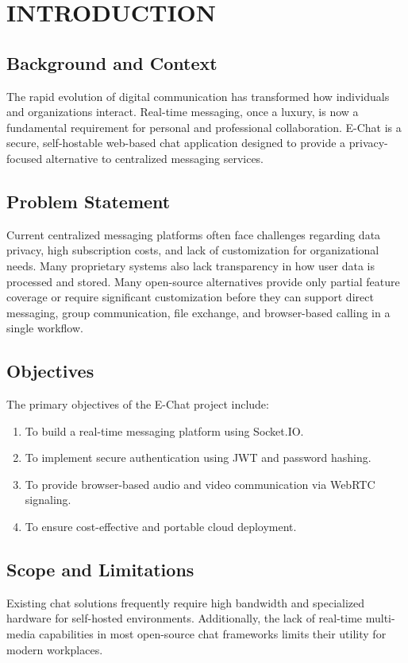 \documentclass[12pt,a4paper,oneside]{report}
\begin{document}
\chapter{INTRODUCTION}
\label{chap:introduction}
\thispagestyle{plain}

\section{Background and Context}
\label{sec:background-context}

The rapid evolution of digital communication has transformed how individuals and
organizations interact. Real-time messaging, once a luxury, is now a fundamental
requirement for personal and professional collaboration. E-Chat is a secure,
self-hostable web-based chat application designed to provide a privacy-focused
alternative to centralized messaging services.

\section{Problem Statement}
\label{sec:problem-statement}

Current centralized messaging platforms often face challenges regarding data
privacy, high subscription costs, and lack of customization for organizational
needs. Many proprietary systems also lack transparency in how user data is
processed and stored. Many open-source alternatives provide only partial feature
coverage or require significant customization before they can support direct
messaging, group communication, file exchange, and browser-based calling in a
single workflow.

\section{Objectives}
\label{sec:objectives}
The primary objectives of the E-Chat project include:
\begin{enumerate}
    \item To build a real-time messaging platform using Socket.IO.
    \item To implement secure authentication using JWT and password hashing.
    \item To provide browser-based audio and video communication via WebRTC signaling.
    \item To ensure cost-effective and portable cloud deployment.
\end{enumerate}

\section{Scope and Limitations}
\label{sec:scope-limitations}
Existing chat solutions frequently require high bandwidth and specialized hardware
for self-hosted environments. Additionally, the lack of real-time multi-media
capabilities in most open-source chat frameworks limits their utility for modern
workplaces.
\end{document}
